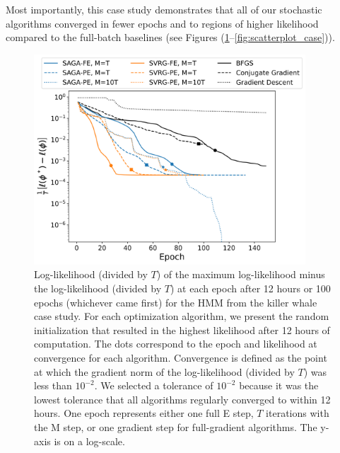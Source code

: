Most importantly, this case study demonstrates that all of our stochastic algorithms converged in fewer epochs and to regions of higher likelihood compared to the full-batch baselines (see Figures (\ref{fig:ll_trace_case}--\ref{fig:scatterplot_case})).
%
\begin{figure}[h]
    \centering
    \includegraphics[width=4in]{../plt/log-like_v_epoch_K-3-3.png}
    \caption{Log-likelihood (divided by $T$) of the maximum log-likelihood minus the log-likelihood (divided by $T$) at each epoch after 12 hours or 100 epochs (whichever came first) for the HMM from the killer whale case study. For each optimization algorithm, we present the random initialization that resulted in the highest likelihood after 12 hours of computation. The dots correspond to the epoch and likelihood at convergence for each algorithm. Convergence is defined as the point at which the gradient norm of the log-likelihood (divided by $T$) was less than $10^{-2}$. We selected a tolerance of $10^{-2}$ because it was the lowest tolerance that all algorithms regularly converged to within 12 hours. One epoch represents either one full E step, $T$ iterations with the M step, or one gradient step for full-gradient algorithms. The y-axis is on a log-scale.}
    \label{fig:ll_trace_case}
\end{figure}
%
